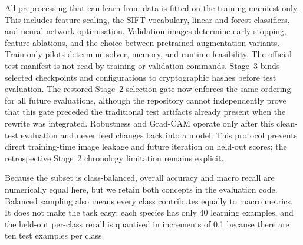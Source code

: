 All preprocessing that can learn from data is fitted on the training manifest
only.  This includes feature scaling, the SIFT vocabulary, linear and forest
classifiers, and neural-network optimisation.  Validation images determine
early stopping, feature ablations, and the choice between pretrained
augmentation variants.  Train-only pilots determine solver, memory, and
runtime feasibility.  The official test manifest is not read by training or
validation commands.  Stage~3 binds selected checkpoints and configurations to
cryptographic hashes before test evaluation.  The restored Stage~2 selection
gate now enforces the same ordering for all future evaluations, although the
repository cannot independently prove that this gate preceded the traditional
test artifacts already present when the rewrite was integrated.
Robustness and Grad-CAM operate only after this clean-test evaluation and never
feed changes back into a model.  This protocol prevents direct training-time
image leakage and future iteration on held-out scores; the retrospective
Stage~2 chronology limitation remains explicit.

Because the subset is class-balanced, overall accuracy and macro recall are
numerically equal here, but we retain both concepts in the evaluation code.
Balanced sampling also means every class contributes equally to macro metrics.
It does not make the task easy: each species has only 40 learning examples,
and the held-out per-class recall is quantised in increments of 0.1 because
there are ten test examples per class.
